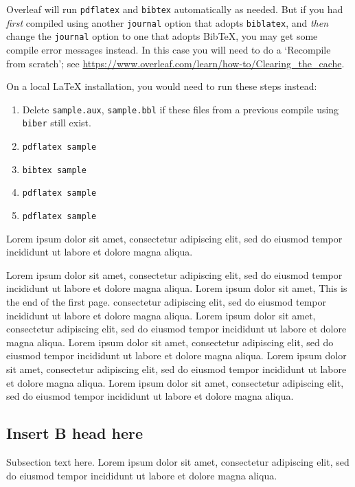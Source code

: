 \documentclass[
  journal=large,
  manuscript=article-type,
  year=2020,
  volume=37,
]{cup-journal}
\begin{document}
Overleaf will run \texttt{pdflatex} and \texttt{bibtex} automatically as needed. But if you had \emph{first} compiled using another \texttt{journal} option that adopts \texttt{biblatex}, and \emph{then} change the \texttt{journal} option to one that adopts Bib\TeX{}, you may get some compile error messages instead. In this case you will need to do a `Recompile from scratch'; see \url{https://www.overleaf.com/learn/how-to/Clearing_the_cache}.

On a local \LaTeX{} installation, you would need to run these steps instead:
\begin{enumerate}
    \item Delete \texttt{sample.aux}, \texttt{sample.bbl} if these files from a previous compile using \texttt{biber} still exist.
    \item \verb|pdflatex sample|
    \item \verb|bibtex sample|
    \item \verb|pdflatex sample|
    \item \verb|pdflatex sample|
\end{enumerate}

Lorem ipsum dolor sit amet, consectetur adipiscing elit, sed do eiusmod tempor incididunt ut labore et dolore magna aliqua. 

Lorem ipsum dolor sit amet, consectetur adipiscing elit, sed do eiusmod tempor incididunt ut labore et dolore magna aliqua. Lorem ipsum dolor sit amet, This
\CUPTWOCOL 
is the end of the first page. 
consectetur adipiscing elit, sed do eiusmod tempor incididunt ut labore et dolore magna aliqua. Lorem ipsum dolor sit amet, consectetur adipiscing elit, sed do eiusmod tempor incididunt ut labore et dolore magna aliqua. Lorem ipsum dolor sit amet, consectetur adipiscing elit, sed do eiusmod tempor incididunt ut labore et dolore magna aliqua. Lorem ipsum dolor sit amet, consectetur adipiscing elit, sed do eiusmod tempor incididunt ut labore et dolore magna aliqua. Lorem ipsum dolor sit amet, consectetur adipiscing elit, sed do eiusmod tempor incididunt ut labore et dolore magna aliqua. 

\subsection{Insert B head here}
Subsection text here. Lorem ipsum \citep{Bayer_etal_2013} dolor sit amet, consectetur adipiscing elit, sed do eiusmod tempor incididunt ut labore \citet{Adade_etal_2007} et dolore magna aliqua. 
\end{document}
